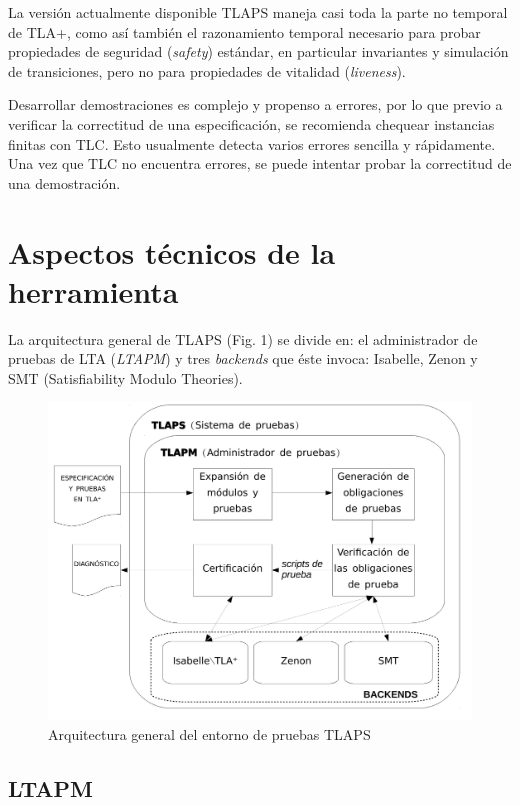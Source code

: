 \documentclass[spanish]{llncs}
\begin{document}
  La versión actualmente disponible TLAPS maneja casi toda la parte no temporal de TLA+, como así también el razonamiento temporal necesario para probar propiedades de seguridad (\textit{safety}) estándar, en particular invariantes y simulación de transiciones, pero no para propiedades de vitalidad (\textit{liveness}).
  
  Desarrollar demostraciones es complejo y propenso a errores, por lo que previo a verificar la correctitud de una especificación,
  se recomienda chequear instancias finitas con TLC. Esto usualmente detecta varios errores sencilla y rápidamente. 
  Una vez que TLC no encuentra errores, se puede intentar probar la correctitud de una demostración. 

  
\section{Aspectos técnicos de la herramienta}

La arquitectura general de TLAPS (Fig. 1) se divide en: el administrador de pruebas de LTA (\textit{LTAPM}) y tres \textit{backends} que éste invoca: Isabelle, Zenon y SMT (Satisfiability Modulo Theories).

\begin{figure}
  \includegraphics[scale=0.4]{esquema-informe-ingsoft2}
  \caption{Arquitectura general del entorno de pruebas TLAPS}
\end{figure}

  
  \subsection{LTAPM}
  
\end{document}
